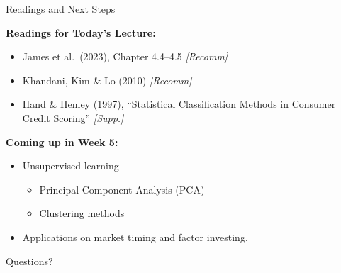 \documentclass[10pt]{beamer}
\begin{document}
\begin{frame}{Readings and Next Steps}

  \textbf{Readings for Today's Lecture:}
  \begin{itemize}
    \item James et al.\ (2023), Chapter 4.4--4.5 \hfill \textit{[Recomm]}
    \item Khandani, Kim \& Lo (2010) \hfill \textit{[Recomm]}
    \item Hand \& Henley (1997), ``Statistical Classification Methods in Consumer Credit Scoring'' \hfill \textit{[Supp.]}
  \end{itemize}

\vspace{1em}
  \textbf{Coming up in Week 5:}
  \begin{itemize}
    \item Unsupervised learning
    \begin{itemize}
        \item Principal Component Analysis (PCA)
        \item Clustering methods
    \end{itemize}
    \item Applications on market timing and factor investing.
  \end{itemize}

\end{frame}


\begin{frame}[plain]
  \centering
  \vfill
  {\Large Questions?}
  \vfill
\end{frame}
\end{document}
